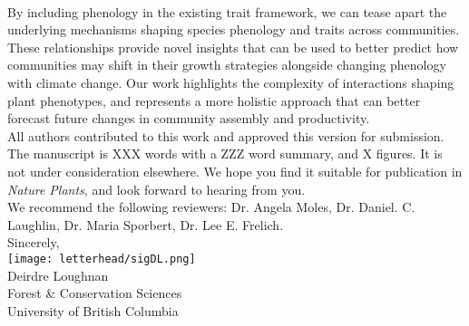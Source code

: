 \documentclass[11pt,a4paper]{article}
\begin{document}
\vspace{1.5ex}\\
\noindent By including phenology in the existing trait framework, we can tease apart the underlying mechanisms shaping species phenology and traits across communities. These relationships provide novel insights that can be used to better predict how communities may shift in their growth strategies alongside changing phenology with climate change. Our work highlights the complexity of interactions shaping plant phenotypes, and represents a more holistic approach that can better forecast future changes in community assembly and productivity.
\vspace{1.5ex}\\
\noindent All authors contributed to this work and approved this version for submission. The manuscript is XXX words with a ZZZ word summary, and X figures. It is not under consideration elsewhere. We hope you find it suitable for publication in \emph{Nature Plants}, and look forward to hearing from you. 
\vspace{1.5ex}\\
\noindent We recommend the following reviewers: Dr. Angela Moles,  Dr. Daniel. C. Laughlin, Dr. Maria Sporbert, Dr. Lee E. Frelich.
\vspace{1.5ex}\\
\noindent Sincerely, \\
\texttt{[image: letterhead/sigDL.png]} \\
\noindent Deirdre Loughnan\\
\noindent Forest \& Conservation Sciences\\
\noindent University of British Columbia

\newpage

\vspace{-5ex}
% 


\newpage
\end{document}
